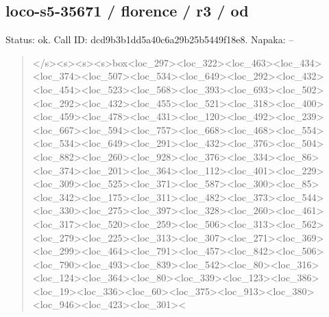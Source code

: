 \documentclass[10pt,a4paper]{article}
\begin{document}
\subsection*{loco-s5-35671 / florence / r3 / od}
Status: ok. Call ID: dcd9b3b1dd5a40c6a29b25b5449f18e8. Napaka: --
\begin{quote}\footnotesize
</s>\allowbreak{}<s>\allowbreak{}<s>\allowbreak{}<s>\allowbreak{}box<loc\_297>\allowbreak{}<loc\_32\allowbreak{}2>\allowbreak{}<loc\_463>\allowbreak{}<loc\_434>\allowbreak{}<loc\_374>\allowbreak{}<lo\allowbreak{}c\_507>\allowbreak{}<loc\_534>\allowbreak{}<loc\_649>\allowbreak{}<loc\_292\allowbreak{}>\allowbreak{}<loc\_432>\allowbreak{}<loc\_454>\allowbreak{}<loc\_523>\allowbreak{}<loc\allowbreak{}\_568>\allowbreak{}<loc\_393>\allowbreak{}<loc\_693>\allowbreak{}<loc\_502>\allowbreak{}\allowbreak{}<loc\_292>\allowbreak{}<loc\_432>\allowbreak{}<loc\_455>\allowbreak{}<loc\_\allowbreak{}521>\allowbreak{}<loc\_318>\allowbreak{}<loc\_400>\allowbreak{}<loc\_459>\allowbreak{}<\allowbreak{}loc\_478>\allowbreak{}<loc\_431>\allowbreak{}<loc\_120>\allowbreak{}<loc\_4\allowbreak{}92>\allowbreak{}<loc\_239>\allowbreak{}<loc\_667>\allowbreak{}<loc\_594>\allowbreak{}<l\allowbreak{}oc\_757>\allowbreak{}<loc\_668>\allowbreak{}<loc\_468>\allowbreak{}<loc\_55\allowbreak{}4>\allowbreak{}<loc\_534>\allowbreak{}<loc\_649>\allowbreak{}<loc\_291>\allowbreak{}<lo\allowbreak{}c\_432>\allowbreak{}<loc\_376>\allowbreak{}<loc\_504>\allowbreak{}<loc\_882\allowbreak{}>\allowbreak{}<loc\_260>\allowbreak{}<loc\_928>\allowbreak{}<loc\_376>\allowbreak{}<loc\allowbreak{}\_334>\allowbreak{}<loc\_86>\allowbreak{}<loc\_374>\allowbreak{}<loc\_201>\allowbreak{}<\allowbreak{}loc\_364>\allowbreak{}<loc\_112>\allowbreak{}<loc\_401>\allowbreak{}<loc\_2\allowbreak{}29>\allowbreak{}<loc\_309>\allowbreak{}<loc\_525>\allowbreak{}<loc\_371>\allowbreak{}<l\allowbreak{}oc\_587>\allowbreak{}<loc\_300>\allowbreak{}<loc\_85>\allowbreak{}<loc\_342\allowbreak{}>\allowbreak{}<loc\_175>\allowbreak{}<loc\_311>\allowbreak{}<loc\_482>\allowbreak{}<loc\allowbreak{}\_373>\allowbreak{}<loc\_544>\allowbreak{}<loc\_330>\allowbreak{}<loc\_275>\allowbreak{}\allowbreak{}<loc\_397>\allowbreak{}<loc\_328>\allowbreak{}<loc\_260>\allowbreak{}<loc\_\allowbreak{}461>\allowbreak{}<loc\_317>\allowbreak{}<loc\_520>\allowbreak{}<loc\_259>\allowbreak{}<\allowbreak{}loc\_506>\allowbreak{}<loc\_313>\allowbreak{}<loc\_562>\allowbreak{}<loc\_2\allowbreak{}79>\allowbreak{}<loc\_225>\allowbreak{}<loc\_313>\allowbreak{}<loc\_307>\allowbreak{}<l\allowbreak{}oc\_271>\allowbreak{}<loc\_369>\allowbreak{}<loc\_299>\allowbreak{}<loc\_46\allowbreak{}4>\allowbreak{}<loc\_791>\allowbreak{}<loc\_457>\allowbreak{}<loc\_842>\allowbreak{}<lo\allowbreak{}c\_506>\allowbreak{}<loc\_790>\allowbreak{}<loc\_493>\allowbreak{}<loc\_839\allowbreak{}>\allowbreak{}<loc\_542>\allowbreak{}<loc\_80>\allowbreak{}<loc\_316>\allowbreak{}<loc\_\allowbreak{}124>\allowbreak{}<loc\_364>\allowbreak{}<loc\_80>\allowbreak{}<loc\_339>\allowbreak{}<l\allowbreak{}oc\_123>\allowbreak{}<loc\_386>\allowbreak{}<loc\_19>\allowbreak{}<loc\_336\allowbreak{}>\allowbreak{}<loc\_60>\allowbreak{}<loc\_375>\allowbreak{}<loc\_913>\allowbreak{}<loc\_\allowbreak{}380>\allowbreak{}<loc\_946>\allowbreak{}<loc\_423>\allowbreak{}<loc\_301>\allowbreak{}<\allow
\end{quote}
\end{document}
